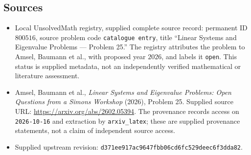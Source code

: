 \documentclass[11pt]{article}
\begin{document}
\subsection{Sources}
\begin{itemize}
\item Local UnsolvedMath registry, supplied complete source record: permanent ID \(800516\), source problem code \texttt{catalogue entry}, title ``Linear Systems and Eigenvalue Problems --- Problem 25.'' The registry attributes the problem to Amsel, Baumann et al., with proposed year \(2026\), and labels it \texttt{open}. This status is supplied metadata, not an independently verified mathematical or literature assessment.
\item Amsel, Baumann et al., \emph{Linear Systems and Eigenvalue Problems: Open Questions from a Simons Workshop} (2026), Problem 25. Supplied source URL: \url{https://arxiv.org/abs/2602.05394}. The provenance records access on \texttt{2026-10-16} and extraction by \texttt{arxiv\_latex}; these are supplied provenance statements, not a claim of independent source access.
\item Supplied upstream revision: \texttt{d371ee917ac9647fbb06cd6fc529deec6f3dda82}.
\end{itemize}
\end{document}
